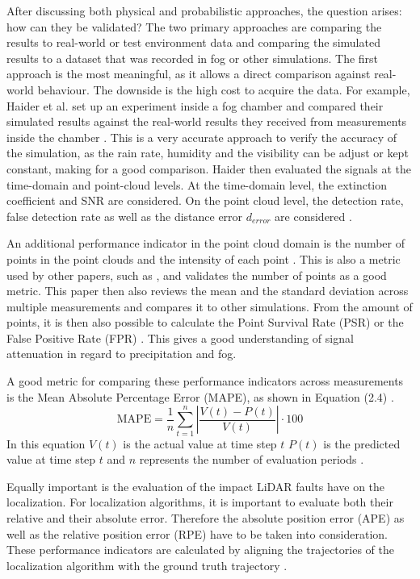 After discussing both physical and probabilistic approaches, the question arises: how can they be validated? The two primary approaches are comparing the results to real-world or test environment data and comparing the simulated results to a dataset that was recorded in fog or other simulations. 
The first approach is the most meaningful, as it allows a direct comparison against real-world behaviour. The downside is the high cost to acquire the data. 
For example, Haider et al. set up an experiment inside a fog chamber and compared their simulated results against the real-world results they received from measurements inside the chamber \cite{haider_methodology_2023}. This is a very accurate approach to verify the accuracy of the simulation, as the rain rate, humidity and the visibility can be adjust or kept constant, making for a good comparison. Haider then evaluated the signals at the time-domain and point-cloud levels. At the time-domain level, the extinction coefficient and SNR are considered. On the point cloud level, the detection rate, false detection rate as well as the distance error $d_{error}$ are considered \cite{haider_methodology_2023}. 

An additional performance indicator in the point cloud domain is the number of points in the point clouds and the intensity of each point \cite{kim_empirical_2023}.
This is also a metric used by other papers, such as \cite{alavi_quantifying_2025}
, and validates the number of points as a good metric. This paper then also reviews the mean and the standard deviation across multiple measurements and compares it to other simulations\cite{alavi_quantifying_2025}.
From the amount of points, it is then also possible to calculate the Point Survival Rate (PSR) or the False Positive Rate (FPR) \cite{haider_methodology_2023}.
This gives a good understanding of signal attenuation in regard to precipitation and fog.

A good metric for comparing these performance indicators across measurements is the Mean Absolute Percentage Error (MAPE), as shown in Equation (2.4) \cite{haider_methodology_2023}. 
\begin{equation}
\mathrm{MAPE} = \frac{1}{n} \sum_{t=1}^{n} 
\left| \frac{V(t) - P(t)}{V(t)} \right| \cdot 100
\end{equation}
In this equation $V(t)$ is the actual value at time step $t$
$P(t)$ is the predicted value at time step $t$
and $n$ represents the number of evaluation periods \cite{noauthor_mape_nodate}. 

Equally important is the evaluation of the impact LiDAR faults have on the localization. For localization algorithms, it is important to evaluate both their relative and their absolute error. Therefore the absolute position error (APE) as well as the relative position error (RPE) have to be taken into consideration. These performance indicators are calculated by aligning the  trajectories of the localization algorithm with the ground truth trajectory \cite{morelli_deep_2025}. 

